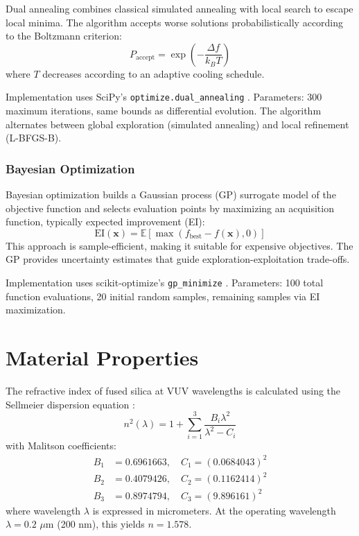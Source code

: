 Dual annealing \cite{xiang1997} combines classical simulated annealing with local search to escape local minima. The algorithm accepts worse solutions probabilistically according to the Boltzmann criterion:
\begin{equation}
P_{\text{accept}} = \exp\left(-\frac{\Delta f}{k_B T}\right)
\end{equation}
where $T$ decreases according to an adaptive cooling schedule.

Implementation uses SciPy's \texttt{optimize.}\allowbreak\texttt{dual\_annealing} \cite{scipy}. Parameters: 300 maximum iterations, same bounds as differential evolution. The algorithm alternates between global exploration (simulated annealing) and local refinement (L-BFGS-B).

\subsubsection{Bayesian Optimization}

Bayesian optimization \cite{mockus1978,jones1998} builds a Gaussian process (GP) surrogate model of the objective function and selects evaluation points by maximizing an acquisition function, typically expected improvement (EI):
\begin{equation}
\text{EI}(\mathbf{x}) = \mathbb{E}[\max(f_{\text{best}} - f(\mathbf{x}), 0)]
\end{equation}
This approach is sample-efficient, making it suitable for expensive objectives. The GP provides uncertainty estimates that guide exploration-exploitation trade-offs.

Implementation uses scikit-optimize's \texttt{gp\_minimize} \cite{skopt}. Parameters: 100 total function evaluations, 20 initial random samples, remaining samples via EI maximization.

\section{Material Properties}

The refractive index of fused silica at VUV wavelengths is calculated using the Sellmeier dispersion equation \cite{malitson1965}:
\begin{equation}
n^2(\lambda) = 1 + \sum_{i=1}^{3} \frac{B_i\lambda^2}{\lambda^2 - C_i}
\end{equation}
with Malitson coefficients:
\begin{align*}
B_1 &= 0.6961663, \quad C_1 = (0.0684043)^2 \\
B_2 &= 0.4079426, \quad C_2 = (0.1162414)^2 \\
B_3 &= 0.8974794, \quad C_3 = (9.896161)^2
\end{align*}
where wavelength $\lambda$ is expressed in micrometers. At the operating wavelength $\lambda = 0.2$ $\mu$m (200 nm), this yields $n = 1.578$.

